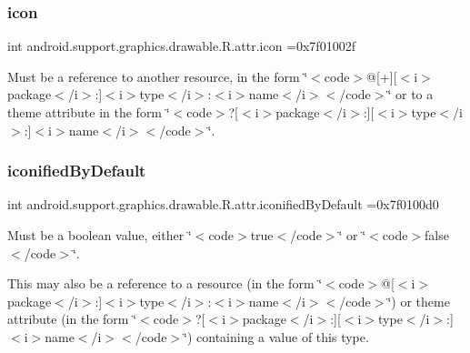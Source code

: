 \subsubsection{\texorpdfstring{icon}{icon}}
{\footnotesize\ttfamily int android.\+support.\+graphics.\+drawable.\+R.\+attr.\+icon =0x7f01002f\hspace{0.3cm}{\ttfamily [static]}}

Must be a reference to another resource, in the form \char`\"{}$<$code$>$@\mbox{[}+\mbox{]}\mbox{[}$<$i$>$package$<$/i$>$\+:\mbox{]}$<$i$>$type$<$/i$>$\+:$<$i$>$name$<$/i$>$$<$/code$>$\char`\"{} or to a theme attribute in the form \char`\"{}$<$code$>$?\mbox{[}$<$i$>$package$<$/i$>$\+:\mbox{]}\mbox{[}$<$i$>$type$<$/i$>$\+:\mbox{]}$<$i$>$name$<$/i$>$$<$/code$>$\char`\"{}. \mbox{\label{classandroid_1_1support_1_1graphics_1_1drawable_1_1R_1_1attr_a684bf42e6a28461e48fa5949df81326c}} 
\subsubsection{\texorpdfstring{iconified\+By\+Default}{iconifiedByDefault}}
{\footnotesize\ttfamily int android.\+support.\+graphics.\+drawable.\+R.\+attr.\+iconified\+By\+Default =0x7f0100d0\hspace{0.3cm}{\ttfamily [static]}}

Must be a boolean value, either \char`\"{}$<$code$>$true$<$/code$>$\char`\"{} or \char`\"{}$<$code$>$false$<$/code$>$\char`\"{}. 

This may also be a reference to a resource (in the form \char`\"{}$<$code$>$@\mbox{[}$<$i$>$package$<$/i$>$\+:\mbox{]}$<$i$>$type$<$/i$>$\+:$<$i$>$name$<$/i$>$$<$/code$>$\char`\"{}) or theme attribute (in the form \char`\"{}$<$code$>$?\mbox{[}$<$i$>$package$<$/i$>$\+:\mbox{]}\mbox{[}$<$i$>$type$<$/i$>$\+:\mbox{]}$<$i$>$name$<$/i$>$$<$/code$>$\char`\"{}) containing a value of this type. \mbox{\label{classandroid_1_1support_1_1graphics_1_1drawable_1_1R_1_1attr_a9e559efd37ab0a462423db7f2283ce93}} 
